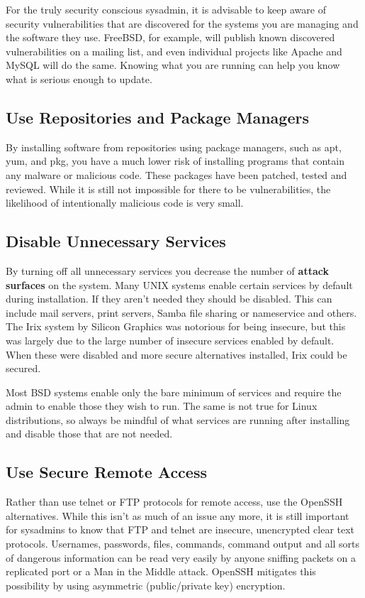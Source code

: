 For the truly security conscious sysadmin, it is advisable to keep aware of security vulnerabilities that are discovered for the systems you are managing and the software they use. FreeBSD, for example, will publish known discovered vulnerabilities on a mailing list, and even individual projects like Apache and MySQL will do the same.  Knowing what you are running can help you know what is serious enough to update. 

\subsection{Use Repositories and Package Managers}

By installing software from repositories using package managers, such as apt, yum, and pkg, you have a much lower risk of installing programs that contain any malware or malicious code.  These packages have been patched, tested and reviewed.  While it is still not impossible for there to be vulnerabilities, the likelihood of intentionally malicious code is very small. 

\subsection{Disable Unnecessary Services}

By turning off all unnecessary services you decrease the number of \textbf{attack surfaces} on the system.  Many UNIX systems enable certain services by default during installation.  If they aren't needed they should be disabled.  This can include mail servers, print servers, Samba file sharing or nameservice and others. The Irix system by Silicon Graphics was notorious for being insecure, but this was largely due to the large number of insecure services enabled by default. When these were disabled and more secure alternatives installed, Irix could be secured.

Most BSD systems enable only the bare minimum of services and require the admin to enable those they wish to run. The same is not true for Linux distributions, so always be mindful of what services are running after installing and disable those that are not needed. 

\subsection{Use Secure Remote Access}

Rather than use telnet or FTP protocols for remote access, use the OpenSSH alternatives.  While this isn't as much of an issue any more, it is still important for sysadmins to know that FTP and telnet are insecure, unencrypted clear text protocols. Usernames, passwords, files, commands, command output and all sorts of dangerous information can be read very easily by anyone sniffing packets on a replicated port or a Man in the Middle attack.  OpenSSH mitigates this possibility by using asymmetric (public/private key) encryption. 

